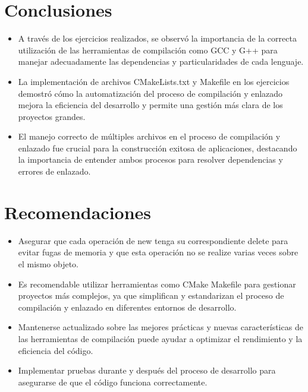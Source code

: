 \documentclass[]{article}
\begin{document}
        
\section{Conclusiones}
    \begin{itemize}
        \item A través de los ejercicios realizados, se observó la importancia de la correcta utilización de las herramientas de compilación como GCC y G++ para manejar adecuadamente las dependencias y particularidades de cada lenguaje.
        \item La implementación de archivos CMakeLists.txt y Makefile en los ejercicios demostró cómo la automatización del proceso de compilación y enlazado mejora la eficiencia del desarrollo y permite una gestión más clara de los proyectos grandes.
        \item El manejo correcto de múltiples archivos en el proceso de compilación y enlazado fue crucial para la construcción exitosa de aplicaciones, destacando la importancia de entender ambos procesos para resolver dependencias y errores de enlazado.
    \end{itemize}

\section{Recomendaciones}
    \begin{itemize}
		\item Asegurar que cada operación de new tenga su correspondiente
		delete para evitar fugas de memoria y que esta operación no
		se realize varias veces sobre el mismo objeto.
        \item  Es recomendable utilizar herramientas como CMake 
		Makefile para gestionar proyectos más complejos, ya que simplifican y 
		estandarizan el proceso de compilación y enlazado en diferentes
		entornos de desarrollo.
        \item Mantenerse actualizado sobre las mejores prácticas y 
		nuevas características de las herramientas de compilación 
		puede ayudar a optimizar el rendimiento y la eficiencia del 
		código.
        \item Implementar pruebas durante y después del proceso
		de desarrollo para asegurarse de que el código funciona 
		correctamente.
	\end{itemize}


\renewcommand{\listlistingname}{Indice Source Code}
\listoflistings
\addcontentsline{toc}{section}{\listlistingname}
\end{document}
